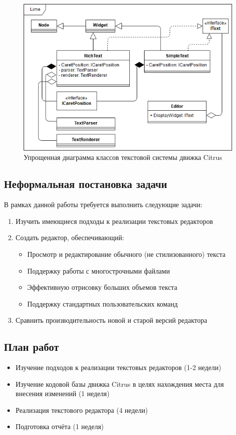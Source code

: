 \documentclass{fefu}
\begin{document}
				\begin{figure}[h]
					\centering
					\includegraphics[width=1\linewidth]{diagrams/CitrusTextSystem.png}
					\caption{Упрощенная диаграмма классов текстовой системы движка Citrus}
					\label{diag:CitrusTextSystem}
				\end{figure}
		\subsection{Неформальная постановка задачи}
			В рамках данной работы требуется выполнить следующие задачи:
			\begin{enumerate}
				\item Изучить имеющиеся подходы к реализации текстовых редакторов
				\item Создать редактор, обеспечивающий:
				\begin{itemize}
					\setlength{\itemindent}{-3em}
					\item Просмотр и редактирование обычного (не стилизованного) текста
					\item Поддержку работы с многострочными файлами
					\item Эффективную отрисовку больших объемов текста
					\item Поддержку стандартных пользовательских команд
				\end{itemize}
				\item Сравнить производительность новой и старой версий редактора
			\end{enumerate}
		\subsection{План работ}
			\begin{itemize}
				\item Изучение подходов к реализации текстовых редакторов (1-2 недели)
				\item Изучение кодовой базы движка Citrus в целях нахождения места для внесения
				изменений (1 неделя)
				\item Реализация текстового редактора (4 недели)
				\item Подготовка отчёта (1 неделя)
			\end{itemize}
\end{document}

